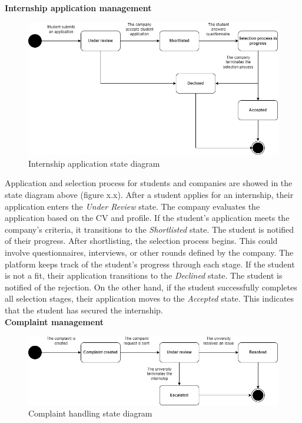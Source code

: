 \textbf{Internship application management}\\
\begin{figure}[H]
	\includegraphics[width=\textwidth,height=\textheight,keepaspectratio]{RASD-Latex/assets/state_diagram_2.png}
	\caption{Internship application state diagram}
	\label{fig:DataRequest}
\end{figure}

Application and selection process for students and companies are showed in the state diagram above (figure x.x). After a student applies for an internship, their application enters the \textit{Under Review} state. The company evaluates the application based on the CV and profile. If the student’s application meets the company’s criteria, it transitions to the \textit{Shortlisted} state. The student is notified of their progress. After shortlisting, the selection process begins. This could involve questionnaires, interviews, or other rounds defined by the company. The platform keeps track of the student's progress through each stage. If the student is not a fit, their application transitions to the \textit{Declined} state. The student is notified of the rejection. On the other hand, if the student successfully completes all selection stages, their application moves to the \textit{Accepted} state. This indicates that the student has secured the internship. \\

\textbf{Complaint management}\\
\begin{figure}[H]
	\includegraphics[width=\textwidth,height=\textheight,keepaspectratio]{RASD-Latex/assets/state_diagram_3.png}
	\caption{Complaint handling state diagram}
	\label{fig:DataRequest}
\end{figure}

